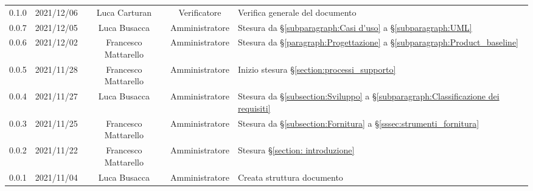 \begin{center}
\begin{longtable}[c]{c | c | c | c | p{5cm}}
		0.1.0 & 2021/12/06 & Luca Carturan 				& Verificatore   & Verifica generale del documento \\
		0.0.7 & 2021/12/05 & Luca Busacca         & Amministratore & Stesura da  §\ref{subparagraph:Casi d'uso} a §\ref{subparagraph:UML} \\
		0.0.6 & 2021/12/02 & Francesco Mattarello & Amministratore & Stesura da  §\ref{paragraph:Progettazione} a §\ref{subparagraph:Product_baseline} \\
		0.0.5 & 2021/11/28 & Francesco Mattarello & Amministratore & Inizio stesura §\ref{section:processi_supporto}\\
		0.0.4 & 2021/11/27 & Luca Busacca         & Amministratore & Stesura da §\ref{subsection:Sviluppo} a  §\ref{subparagraph:Classificazione dei requisiti} \\
		0.0.3 & 2021/11/25 & Francesco Mattarello & Amministratore & Stesura da §\ref{subsection:Fornitura} a §\ref{sssec:strumenti_fornitura} \\
		0.0.2 & 2021/11/22 & Francesco Mattarello & Amministratore & Stesura §\ref{section: introduzione} \\
		0.0.1 & 2021/11/04 & Luca Busacca         & Amministratore & Creata struttura documento \\
	\end{longtable}
\end{center}
